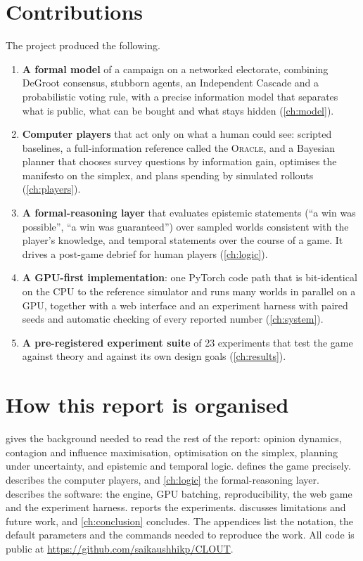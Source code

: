 \documentclass[11pt,a4paper,oneside]{report}
\newcommand{\ORACLE}{\textsc{Oracle}}
\newcommand{\repo}{\url{https://github.com/saikaushhikp/CLOUT}}
\begin{document}
\section{Contributions}

The project produced the following.
\begin{enumerate}
  \item \textbf{A formal model} of a campaign on a networked electorate, combining DeGroot consensus,
        stubborn agents, an Independent Cascade and a probabilistic voting rule, with a precise information
        model that separates what is public, what can be bought and what stays hidden
        (\cref{ch:model}).
  \item \textbf{Computer players} that act only on what a human could see: scripted baselines, a
        full-information reference called the \ORACLE, and a Bayesian planner that chooses survey questions
        by information gain, optimises the manifesto on the simplex, and plans spending by simulated
        rollouts (\cref{ch:players}).
  \item \textbf{A formal-reasoning layer} that evaluates epistemic statements (``a win was possible'',
        ``a win was guaranteed'') over sampled worlds consistent with the player's knowledge, and temporal
        statements over the course of a game. It drives a post-game debrief for human players
        (\cref{ch:logic}).
  \item \textbf{A GPU-first implementation}: one PyTorch code path that is bit-identical on the CPU to the
        reference simulator and runs many worlds in parallel on a GPU, together with a web interface and
        an experiment harness with paired seeds and automatic checking of every reported number
        (\cref{ch:system}).
  \item \textbf{A pre-registered experiment suite} of 23 experiments that test the game against theory
        and against its own design goals (\cref{ch:results}).
\end{enumerate}

\section{How this report is organised}

 gives the background needed to read the rest of the report: opinion dynamics,
contagion and influence maximisation, optimisation on the simplex, planning under uncertainty, and
epistemic and temporal logic.  defines the game precisely.  describes the
computer players, and \cref{ch:logic} the formal-reasoning layer.  describes the software:
the engine, GPU batching, reproducibility, the web game and the experiment harness. 
reports the experiments.  discusses limitations and future work, and \cref{ch:conclusion}
concludes. The appendices list the notation, the default parameters and the commands needed to reproduce
the work. All code is public at \repo.
\end{document}
